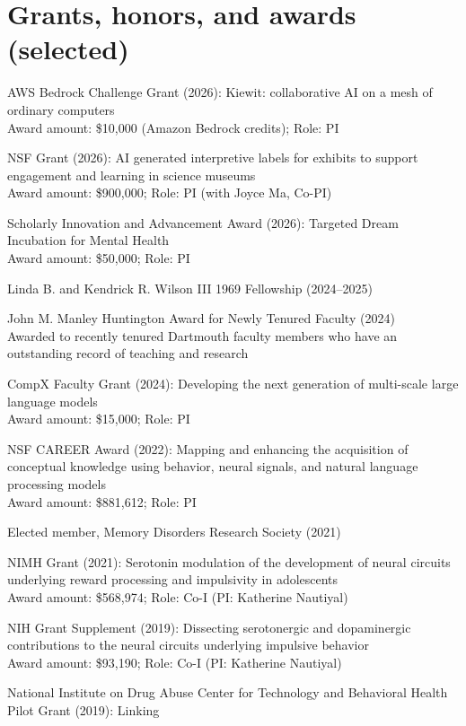 \documentclass[11pt, a4paper]{article} %
\begin{document}
\section*{Grants, honors, and awards (selected)}
\begin{etaremune}
\item AWS Bedrock Challenge Grant (2026): Kiewit: collaborative AI on a mesh of ordinary computers\\
Award amount: \$10,000 (Amazon Bedrock credits); Role: PI
\item NSF Grant (2026): AI generated interpretive labels for exhibits
to support engagement and learning in science museums\\
Award amount: \$900,000; Role: PI (with Joyce Ma, Co-PI)
\item Scholarly Innovation and Advancement Award (2026): Targeted Dream Incubation for Mental Health\\
Award amount: \$50,000; Role: PI
\item Linda B. and Kendrick R. Wilson III 1969 Fellowship (2024--2025)
\item John M. Manley Huntington Award for Newly Tenured Faculty (2024)\\
  Awarded to recently tenured Dartmouth faculty members who have an outstanding record of teaching and research
\item CompX Faculty Grant (2024): Developing the next generation of multi-scale large language
  models\\
  Award amount: \$15,000; Role: PI
\item NSF CAREER Award (2022): Mapping and enhancing the acquisition
of conceptual knowledge using behavior, neural signals, and natural
language processing models\\
Award amount: \$881,612; Role: PI
\item Elected member, Memory Disorders Research Society (2021)
\item NIMH Grant (2021): Serotonin modulation of the development of
neural circuits underlying reward processing and impulsivity in
adolescents\\
Award amount: \$568,974; Role: Co-I (PI: Katherine Nautiyal)
\item NIH Grant Supplement (2019): Dissecting serotonergic and
dopaminergic contributions to the neural circuits underlying impulsive
behavior\\
Award amount: \$93,190; Role: Co-I (PI: Katherine Nautiyal)
\item National Institute on Drug Abuse Center for Technology and Behavioral Health Pilot Grant (2019): Linking

\end{etaremune}
\end{document}
